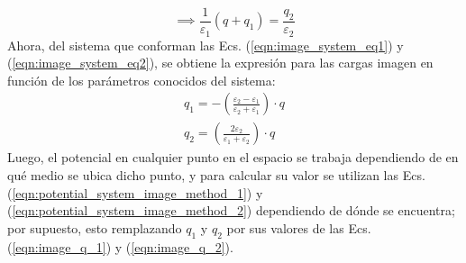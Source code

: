 \documentclass[12pt, oneside, numbers, spanish]{ezthesis}
\numberwithin{equation}{section}
\begin{document}
\begin{equation}\label{eqn:image_system_eq2}
\implies \frac{1}{\varepsilon_1}(q + q_1) = \frac{q_2}{\varepsilon_2}
\end{equation}
Ahora, del sistema que conforman las Ecs. (\ref{eqn:image_system_eq1}) y (\ref{eqn:image_system_eq2}), se obtiene la expresión para las cargas imagen en función de los parámetros conocidos del sistema:
\begin{gather}
q_1 = -\left(\frac{\varepsilon_2 - \varepsilon_1}{\varepsilon_2 + \varepsilon_1}\right)\cdot q \label{eqn:image_q_1}\\
q_2 = \left(\frac{2\varepsilon_2}{\varepsilon_1 + \varepsilon_2}\right)\cdot q \label{eqn:image_q_2}
\end{gather}
Luego, el potencial en cualquier punto en el espacio se trabaja dependiendo de en qué medio se ubica dicho punto, y para calcular su valor se utilizan las Ecs. (\ref{eqn:potential_system_image_method_1}) y (\ref{eqn:potential_system_image_method_2}) dependiendo de dónde se encuentra; por supuesto, esto remplazando $q_1$ y $q_2$ por sus valores de las Ecs. (\ref{eqn:image_q_1}) y (\ref{eqn:image_q_2}).
\end{document}
